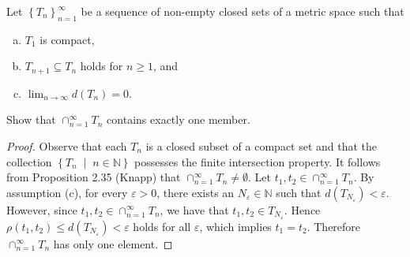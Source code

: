 \documentclass[10pt]{amsart}
\begin{document}
\begin{ex12}
  Let $\left\{T_n\right\}_{n=1}^{\infty}$ be a sequence of non-empty closed sets of a metric space such that 
  \begin{enumerate}[(a)]
    \item
      $T_1$ is compact,
    \item
      $T_{n+1} \subseteq T_n$ holds for $n \geq 1$, and
    \item
      $\lim_{n \rightarrow \infty} d(T_n) = 0$.
  \end{enumerate}
  Show that $\cap_{n=1}^{\infty} T_n$ contains exactly one member.
  \begin{proof}
    Observe that each $T_n$ is a closed subset of a compact set and that the collection $\left\{T_n \;\middle\vert\; n \in \mathbb{N}\right\}$ possesses the finite intersection property.
    It follows from Proposition 2.35 (Knapp) that $\cap_{n=1}^{\infty} T_n \not = \emptyset$.
    Let $t_1, t_2 \in \cap_{n=1}^{\infty} T_n$.
    By assumption (c), for every $\varepsilon > 0$, there exists an $N_\varepsilon \in \mathbb{N}$ such that $d(T_{N_\varepsilon}) < \varepsilon$.
    However, since $t_1, t_2 \in \cap_{n=1}^{\infty} T_n$, we have that $t_1, t_2 \in T_{N_\varepsilon}$. 
    Hence $\rho(t_1, t_2) \leq d(T_{N_\varepsilon}) < \varepsilon$ holds for all $\varepsilon$, which implies $t_1 = t_2$.
    Therefore $\cap_{n=1}^{\infty} T_n$ has only one element.
  \end{proof}
\end{ex12}
\end{document}
